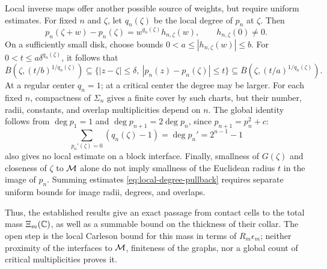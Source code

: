 Local inverse maps offer another possible source of weights, but
require uniform estimates. For fixed \(n\) and \(\zeta\), let
\(q_n(\zeta)\) be the local degree of \(p_n\) at \(\zeta\). Then
\[
 p_n(\zeta+w)-p_n(\zeta)=w^{q_n(\zeta)}h_{n,\zeta}(w),
 \qquad h_{n,\zeta}(0)\ne0.
\]
On a sufficiently small disk, choose bounds
\(0<a\le|h_{n,\zeta}(w)|\le b\). For
\(0<t\le a\delta^{q_n(\zeta)}\), it follows that
\begin{equation}
 \overline B\!\left(\zeta,(t/b)^{1/q_n(\zeta)}\right)
 \subseteq\{|z-\zeta|\le\delta,\ |p_n(z)-p_n(\zeta)|\le t\}
 \subseteq\overline B\!\left(\zeta,(t/a)^{1/q_n(\zeta)}\right).
 \label{eq:local-degree-pullback}
\end{equation}
At a regular center \(q_n=1\); at a critical center the degree may be
larger. For each fixed \(n\), compactness of \(\Sigma_n\) gives a finite
cover by such charts, but their number, radii, constants, and overlap
multiplicities depend on \(n\). The global identity follows from
\(\deg p_1=1\) and \(\deg p_{n+1}=2\deg p_n\), since
\(p_{n+1}=p_n^2+c\):
\[
 \sum_{p_n'(\zeta)=0}(q_n(\zeta)-1)
 =\deg p_n'=2^{n-1}-1
\]
also gives no local estimate on a block interface. Finally, smallness
of \(G(\zeta)\) and closeness of \(\zeta\) to \(\mathcal M\) alone do not imply
smallness of the Euclidean radius \(t\) in the image of \(p_n\).
Summing estimates \eqref{eq:local-degree-pullback} requires separate
uniform bounds for image radii, degrees, and overlaps.

Thus, the established results give an exact passage from contact cells
to the total mass \(\Xi_m(\mathbb C)\), as well as a summable bound on the
thickness of their collar. The open step is the local Carleson bound
for this mass in terms of \(R_m\epsilon_m\); neither proximity of the
interfaces to \(\mathcal M\), finiteness of the graphs, nor a global count of
critical multiplicities proves it.
